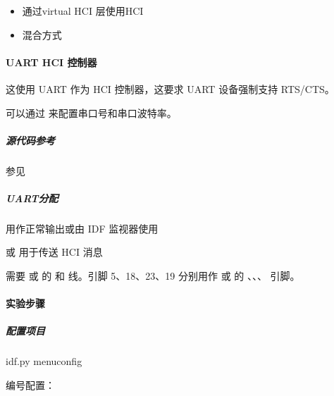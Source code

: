 \documentclass[a4paper,12pt,english]{sphinxmanual}
\begin{document}
{{\begin{itemize}
\item {} 
\sphinxAtStartPar
通过virtual HCI 层使用HCI

\item {} 
\sphinxAtStartPar
混合方式

\end{itemize}

\sphinxAtStartPar
{}


\paragraph{UART HCI 控制器}
\label{\detokenize{exp-esp32/bluetooth/hci:uart-hci}}
\sphinxAtStartPar
这使用 UART 作为 HCI 控制器，这要求 UART 设备强制支持 RTS/CTS。

\sphinxAtStartPar
可以通过  来配置串口号和串口波特率。


\subparagraph{源代码参考}
\label{\detokenize{exp-esp32/bluetooth/hci:id1}}
\sphinxAtStartPar
参见{\hyperref[\detokenize{reference::doc}]{}}


\subparagraph{UART分配}
\label{\detokenize{exp-esp32/bluetooth/hci:uart}}
\sphinxAtStartPar
{} 用作正常输出或由 IDF 监视器使用

\sphinxAtStartPar
{} 或  用于传送 HCI 消息

\sphinxAtStartPar
需要  或  的  和  线。引脚 5、18、23、19 分别用作  或  的 、、、 引脚。


\paragraph{实验步骤}
\label{\detokenize{exp-esp32/bluetooth/hci:id2}}

\subparagraph{配置项目}
\label{\detokenize{exp-esp32/bluetooth/hci:id3}}
\begin{sphinxVerbatim}[commandchars=\\\{\}]
idf.py menuconfig
\end{sphinxVerbatim}

\sphinxAtStartPar
{}编号配置：

}}
\end{document}
